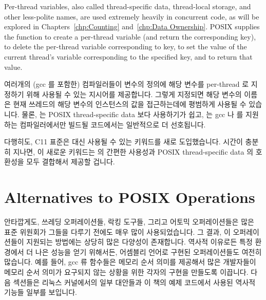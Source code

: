 Per-thread variables, also called thread-specific data, thread-local
storage, and other less-polite names, are used extremely
heavily in concurrent code, as will be explored in
Chapters~\ref{chp:Counting} and~\ref{chp:Data Ownership}.
POSIX supplies the  function to create a
per-thread variable (and return the corresponding key),
 to delete the per-thread variable corresponding
to key,
 to set the value of the current thread's
variable corresponding to the specified key,
and  to return that value.
\fi

여러개의 (gcc 를 포함한) 컴파일러들이 변수의 정의에 해당 변수를 per-thread 로
지정하기 위해 사용될 수 있는  지시어를 제공합니다.
그렇게 지정되면 해당 변수의 이름은 현재 쓰레드의 해당 변수의 인스턴스의 값을
접근하는데에 평범하게 사용될 수 있습니다.
물론,  는 POSIX thread-specific data 보다 사용하기가 쉽고,
 는 gcc 나  를 지원하는 컴파일러에서만 빌드될
코드에서는 일반적으로 더 선호됩니다.

다행히도, C11 표준은  대신 사용될 수 있는 
키워드를 새로 도입했습니다.
시간이 충분히 지나면, 이 새로운 키워드는  의 간편한 사용성과 POSIX
thread-specific data 의 호환성을 모두 결합해서 제공할 겁니다.

\section{Alternatives to POSIX Operations}
\label{sec:toolsoftrade:Alternatives to POSIX Operations}

안타깝게도, 쓰레딩 오퍼레이션들, 락킹 도구들, 그리고 어토믹 오퍼레이션들은 많은
표준 위원회가 그들을 다루기 전에도 매우 많이 사용되었습니다.
그 결과, 이 오퍼레이션들이 지원되는 방법에는 상당히 많은 다양성이 존재합니다.
역사적 이유로든 특정 환경에서 더 나은 성능을 얻기 위해서든, 어셈블리 언어로
구현된 오퍼레이션들도 여전히 많습니다.
예를 들어, gcc  류 함수들은 메모리 순서 의미를 제공해서 많은
개발자들이 메모리 순서 의미가 요구되지 않는 상황을 위한 각자의 구현을 만들도록
이끕니다.
다음 섹션들은 리눅스 커널에서의 일부 대안들과 이 책의 예제 코드에서 사용된
역사적 기능들 일부를 보입니다.
\iffalse

